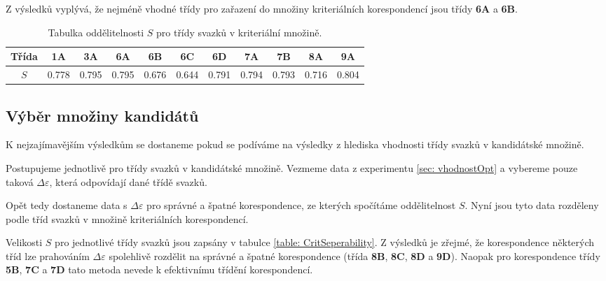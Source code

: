 	Z výsledků vyplývá, že nejméně vhodné třídy pro zařazení do množiny kriteriálních korespondencí jsou třídy \textbf{6A} a \textbf{6B}. 

  \begin{table}[h!]
\centering
\begin{tabular}{|c||c|c|c|c|c|c|c|c|c|c|}
\hline
Třída & \textbf{1A} & \textbf{3A} & \textbf{6A}  & \textbf{6B} & \textbf{6C} & \textbf{6D} & \textbf{7A} & \textbf{7B}& \textbf{8A} & \textbf{9A}\\
\hline
$S$   &0.778 & 0.795 & 0.795 & 0.676 & 0.644 & 0.791 & 0.794 & 0.793 & 0.716 & 0.804 \\
\hline
\end{tabular}
\caption{Tabulka oddělitelnosti $S$ pro třídy svazků v kriteriální množině.}
\label{table: GroupSeperability}
\end{table}

\subsection{Výběr množiny kandidátů }
	K nejzajímavějším výsledkům se dostaneme pokud se podíváme na výsledky z hlediska vhodnosti třídy svazků v kandidátské množině. 
	
	Postupujeme jednotlivě pro třídy svazků v kandidátské množině. Vezmeme data z experimentu \ref{sec: vhodnostOpt} a vybereme pouze taková $\Delta\varepsilon$, která odpovídají dané třídě svazků.
	
	 Opět tedy dostaneme data s $\Delta\varepsilon$ pro správné a špatné korespondence, ze kterých spočítáme oddělitelnost $S$. Nyní jsou tyto data rozděleny podle tříd svazků v množině kriteriálních korespondencí. 
	 
	 Velikosti $S$  pro jednotlivé třídy svazků jsou zapsány v tabulce \ref{table: CritSeperability}. Z výsledků je zřejmé, že korespondence některých tříd lze prahováním  $\Delta\varepsilon$ spolehlivě rozdělit na správné a špatné korespondence (třída \textbf{8B}, \textbf{8C}, \textbf{8D} a \textbf{9D}). Naopak pro korespondence třídy \textbf{5B}, \textbf{7C} a \textbf{7D} tato metoda nevede k efektivnímu třídění korespondencí. 

